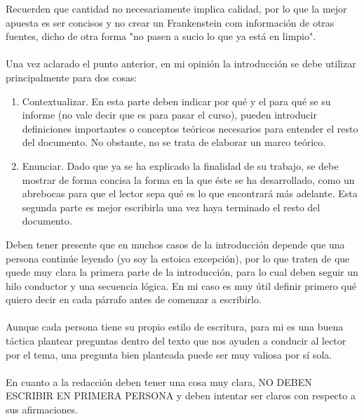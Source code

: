 \documentclass[12pt]{article}
\begin{document}
    Recuerden que cantidad no necesariamente implica calidad, por lo que la mejor apuesta 
    es ser concisos y no crear un Frankenstein com información de otras fuentes, dicho de 
    otra forma "no pasen a sucio lo que ya está en limpio".\\
    \\
    Una vez aclarado el punto anterior, en mi opinión la introducción se debe utilizar 
    principalmente para dos cosas:
    \begin{enumerate}
        \item Contextualizar. En esta parte deben indicar por qué y el para qué se su informe 
        (no vale decir que es para pasar el curso), pueden introducir definiciones 
        importantes o conceptos teóricos necesarios para entender el resto del 
        documento. No obstante, no se trata de elaborar un marco teórico.

        \item Enunciar. Dado que ya se ha explicado la finalidad de su trabajo, se debe mostrar 
        de forma concisa la forma en la que éste se ha desarrollado, como un abrebocas 
        para que el lector sepa qué es lo que encontrará más adelante. Esta segunda 
        parte es mejor escribirla una vez haya terminado el resto del documento.
    \end{enumerate}
    Deben tener presente que en muchos casos de la introducción depende que una persona 
    continúe leyendo (yo soy la estoica excepción), por lo que traten de que quede muy clara la 
    primera parte de la introducción, para lo cual deben seguir un hilo conductor y una 
    secuencia lógica. En mi caso es muy útil definir primero qué quiero decir en cada párrafo 
    antes de comenzar a escribirlo.\\
    \\
    Aunque cada persona tiene su propio estilo de escritura, para mi es una buena táctica 
    plantear preguntas dentro del texto que nos ayuden a conducir al lector por el tema, una 
    pregunta bien planteada puede ser muy valiosa por sí sola.\\
    \\
    En cuanto a la redacción deben tener una cosa muy clara, NO DEBEN ESCRIBIR EN 
    PRIMERA PERSONA y deben intentar ser claros con respecto a sus afirmaciones.
    
\end{document}
